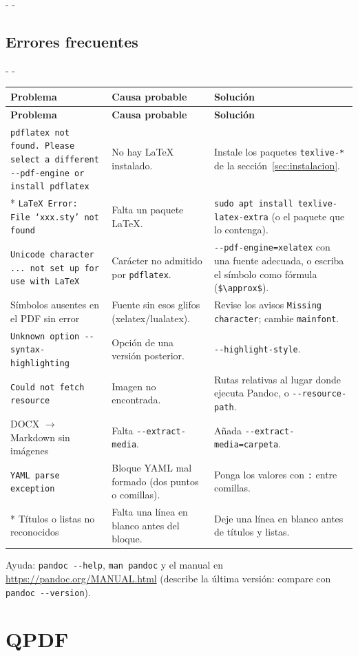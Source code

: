 \documentclass[11pt,a4paper]{article}
\makeatletter
\newcommand{\necesitaespacio}[1]{\par\penalty-100\begingroup
	\setlength{\dimen@}{#1}\dimen@ii\pagegoal\advance\dimen@ii-\pagetotal
	\ifdim\dimen@>\dimen@ii\ifdim\dimen@ii>\z@\vfil\fi\penalty-\@M\fi\endgroup}
\newenvironment{errores}{%
	\par\begingroup\small
	\begin{longtable}{L{4.1cm}L{4.9cm}L{6.0cm}}
		\toprule\rowcolor{tablacab}\cab{Problema} & \cab{Causa probable} & \cab{Solución} \\ \midrule
		\endfirsthead
		\toprule\rowcolor{tablacab}\cab{Problema} & \cab{Causa probable} & \cab{Solución} \\ \midrule
		\endhead
		\bottomrule
		\endfoot}
	{\end{longtable}\endgroup}
\newcommand{\cmd}[1]{\texttt{\textcolor{colcmd}{#1}}}      %
\newcommand{\opt}[1]{\texttt{\textcolor{colopt}{#1}}}      %
\newcommand{\cab}[1]{\textbf{#1}}
\makeatother
\begin{document}
	\necesitaespacio{14\baselineskip}
	\subsection{Errores frecuentes}
	
	\necesitaespacio{10\baselineskip}
	\begin{errores}
		\texttt{pdflatex not found. Please select a different -{}-pdf-\allowbreak{}engine or install pdflatex} & No hay LaTeX instalado. & Instale los paquetes \texttt{texlive-*} de la sección~\ref{sec:instalacion}.\\*
		\texttt{LaTeX Error: File `xxx.sty' not found} & Falta un paquete LaTeX. & \cmd{sudo apt install texlive-\allowbreak{}latex-\allowbreak{}extra} (o el paquete que lo contenga).\\
		\texttt{Unicode character ... not set up for use with LaTeX} & Carácter no admitido por \cmd{pdflatex}. & \opt{-{}-pdf-engine=xelatex} con una fuente adecuada, o escriba el símbolo como fórmula (\verb|$\approx$|).\\
		Símbolos ausentes en el PDF sin error & Fuente sin esos glifos (xelatex/lualatex). & Revise los avisos \texttt{Missing character}; cambie \opt{mainfont}.\\
		\texttt{Unknown option -{}-syntax-\allowbreak{}highlighting} & Opción de una versión posterior. & \opt{-{}-highlight-\allowbreak{}style}.\\
		\texttt{Could not fetch resource} & Imagen no encontrada. & Rutas relativas al lugar donde ejecuta Pandoc, o \opt{-{}-resource-\allowbreak{}path}.\\
		DOCX $\rightarrow$ Markdown sin imágenes & Falta \opt{-{}-extract-\allowbreak{}media}. & Añada \opt{-{}-extract-\allowbreak{}media=\allowbreak{}carpeta}.\\
		\texttt{YAML parse exception} & Bloque YAML mal formado (dos puntos o comillas). & Ponga los valores con \texttt{:} entre comillas.\\*
		Títulos o listas no reconocidos & Falta una línea en blanco antes del bloque. & Deje una línea en blanco antes de títulos y listas.\\
	\end{errores}
	
	Ayuda: \cmd{pandoc -{}-help}, \cmd{man pandoc} y el manual en \url{https://pandoc.org/MANUAL.html} (describe la última versión: compare con \cmd{pandoc -{}-version}).
	\clearpage
	\section{QPDF}\label{sec:qpdf}
	
\end{document}
